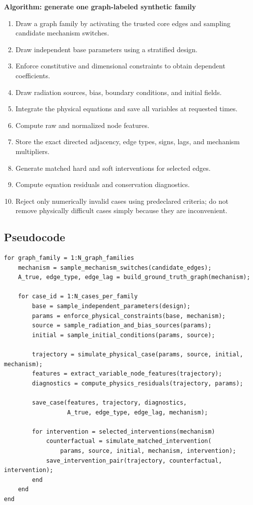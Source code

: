 \documentclass[11pt]{article}
\begin{document}
\begin{designbox}
\textbf{Algorithm: generate one graph-labeled synthetic family}
\begin{enumerate}[leftmargin=1.6em]
    \item Draw a graph family by activating the trusted core edges and sampling candidate mechanism switches.
    \item Draw independent base parameters using a stratified design.
    \item Enforce constitutive and dimensional constraints to obtain dependent coefficients.
    \item Draw radiation sources, bias, boundary conditions, and initial fields.
    \item Integrate the physical equations and save all variables at requested times.
    \item Compute raw and normalized node features.
    \item Store the exact directed adjacency, edge types, signs, lags, and mechanism multipliers.
    \item Generate matched hard and soft interventions for selected edges.
    \item Compute equation residuals and conservation diagnostics.
    \item Reject only numerically invalid cases using predeclared criteria; do not remove physically difficult cases simply because they are inconvenient.
\end{enumerate}
\end{designbox}

\subsection{Pseudocode}

\begin{lstlisting}[basicstyle=\ttfamily\small,frame=single,breaklines=true]
for graph_family = 1:N_graph_families
    mechanism = sample_mechanism_switches(candidate_edges);
    A_true, edge_type, edge_lag = build_ground_truth_graph(mechanism);

    for case_id = 1:N_cases_per_family
        base = sample_independent_parameters(design);
        params = enforce_physical_constraints(base, mechanism);
        source = sample_radiation_and_bias_sources(params);
        initial = sample_initial_conditions(params, source);

        trajectory = simulate_physical_case(params, source, initial, mechanism);
        features = extract_variable_node_features(trajectory);
        diagnostics = compute_physics_residuals(trajectory, params);

        save_case(features, trajectory, diagnostics,
                  A_true, edge_type, edge_lag, mechanism);

        for intervention = selected_interventions(mechanism)
            counterfactual = simulate_matched_intervention(
                params, source, initial, mechanism, intervention);
            save_intervention_pair(trajectory, counterfactual, intervention);
        end
    end
end
\end{lstlisting}
\end{document}
